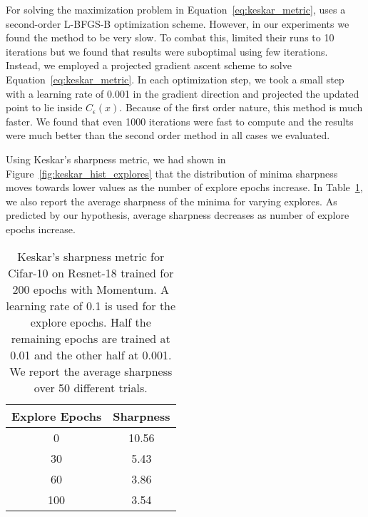 \documentclass[twoside,11pt]{article}
\begin{document}
For solving the maximization problem in Equation~\ref{eq:keskar_metric}, \cite{keskar2016large} uses a second-order L-BFGS-B \citep{byrd-lbgfs} optimization scheme. However, in our experiments we found the method to be very slow. To combat this, \cite{keskar2016large} limited their runs to 10 iterations but we found that results were suboptimal using few iterations. Instead, we employed a projected gradient ascent scheme to solve Equation~\ref{eq:keskar_metric}. In each optimization step, we took a small step with a learning rate of 0.001 in the gradient direction and projected the updated point to lie inside $C_{\epsilon}(x)$. Because of the first order nature, this method is much faster. We found that even 1000 iterations were fast to compute and the results were much better than the second order method in all cases we evaluated.










Using Keskar's sharpness metric, we had shown in Figure~\ref{fig:keskar_hist_explores} that the distribution of minima sharpness moves towards lower values as the number of explore epochs increase. In Table~\ref{tab:keskar_avg}, we also report the average sharpness of the minima for varying explores. As predicted by our hypothesis, average sharpness decreases as number of explore epochs increase.

\begin{table}[hbt!]
\begin{minipage}{.6\textwidth}
    \caption{Keskar's sharpness metric for Cifar-10 on Resnet-18 trained for 200 epochs with Momentum. A learning  rate of 0.1 is used for the explore epochs. Half the remaining epochs are trained at 0.01 and the other half at 0.001. We report the average sharpness over 50 different trials.}
\label{tab:keskar_avg}
\end{minipage}\hfill
\begin{minipage}{.35\textwidth}\vspace*{-14pt}\begin{tabular}{cc}
  \toprule
  Explore Epochs       &  Sharpness \\
\midrule
  0 & 10.56\\
  30 & 5.43\\
  60 & 3.86\\
  100 & 3.54\\
 \bottomrule
\end{tabular}
\end{minipage}
\end{table}
\vspace{-15pt}
\end{document}

